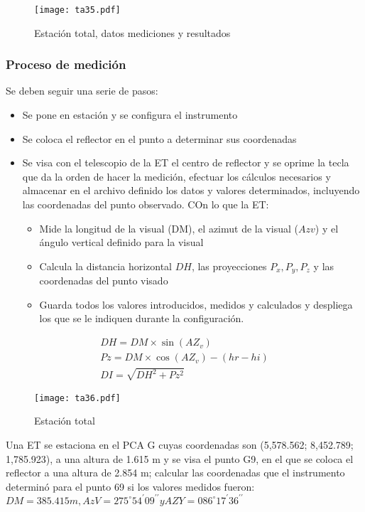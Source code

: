 \begin{figure}[h!]
\centering
  \texttt{[image: ta35.pdf]}
  \caption{Estación total, datos mediciones y resultados}
  \label{ta35}
\end{figure}

\subsubsection{Proceso de medición}

Se deben seguir una serie de pasos:
\begin{itemize}
    \item Se pone en estación y se configura el instrumento
    \item Se coloca el reflector en el punto a determinar sus coordenadas
    \item Se visa con el telescopio de la ET el centro de reflector y se oprime la tecla que da la orden de hacer la medición, efectuar los cálculos necesarios y almacenar en el archivo definido los datos y valores determinados, incluyendo las coordenadas del punto observado. COn lo que la ET: \begin{itemize}
        \item Mide la longitud de la visual (DM), el azimut de la visual ($Azv$) y el ángulo vertical definido para la visual
        \item Calcula la distancia horizontal $DH$, las proyecciones $P_x,P_y,P_z$ y las coordenadas del punto visado
        \item Guarda todos los valores introducidos, medidos y calculados y despliega los que se le indiquen durante la configuración.
    \end{itemize}
\end{itemize}


\begin{align}
    DH = DM \times \sin{(AZ_v)}\\
    Pz = DM \times \cos{(AZ_v)} -(hr - hi)\\
    DI = \sqrt{DH^2 + Pz^2}
\end{align}
\begin{figure}[h!]
\centering
  \texttt{[image: ta36.pdf]}
  \caption{Estación total}
  \label{ta36}
\end{figure}

Una ET se estaciona en el PCA G cuyas coordenadas son (5,578.562; 8,452.789; 1,785.923), a una altura de 1.615 m y se visa el punto G9, en el que se coloca el reflector a una altura de 2.854 m; calcular las coordenadas que el instrumento determinó para el punto 69 si los valores medidos fueron: $DM= 385.415 m, AzV= 275^{\circ} 54^{\prime} 09^{\prime\prime} y AZY= 086^{\circ} 17^{\prime} 36^{\prime\prime}$

